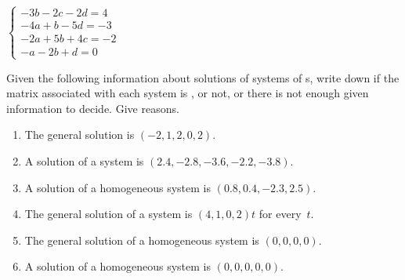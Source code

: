 \begin{exercise}
\begin{Parts}
\begin{reduce}
\item \(\begin{cases}-3b-2c-2d=4
\\-4a+b-5d=-3
\\-2a+5b+4c=-2
\\-a-2b+d=0 \end{cases}\)
\end{reduce}

\end{Parts}
\end{exercise}




\begin{exercise}  
Given the following information about solutions of systems of s, write down if the matrix associated with each system is , or not, or there is not enough given information to decide.  
Give reasons.
\begin{enumerate}
\item The general solution is \((-2,1,2,0,2)\).

\item A solution of a system is \((2.4,-2.8,-3.6,-2.2,-3.8)\).

\item A solution of a homogeneous system is \((0.8,0.4,-2.3,2.5)\).%

\item The general solution of a system is \((4,1,0,2)t\) for every~\(t\).%

\item The general solution of a homogeneous system is \((0,0,0,0)\).%

\item A solution of a homogeneous system is \((0,0,0,0,0)\).

\end{enumerate}
\end{exercise}





